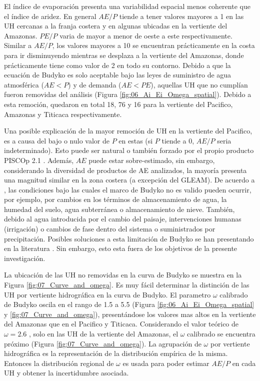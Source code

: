 \documentclass[12pt]{article}
\begin{document}
El índice de evaporación presenta una variabilidad espacial menos coherente que el índice de aridez. En general $AE/P$ tiende a tener valores mayores a 1 en las UH cercanas a la franja costera y en algunas ubicadas en la vertiente del Amazonas. $PE/P$ varia de mayor a menor de oeste a este respectivamente. Similar a $AE/P$, los valores mayores a 10 se encuentran prácticamente en la costa para ir disminuyendo mientras se desplaza a la vertiente del Amazonas, donde prácticamente tiene como valor de 2 en todo su contorno. Debido a que la ecuación de Budyko es solo aceptable bajo las leyes de suministro de agua atmosférica ($AE < P$) y de demanda ($AE < PE$), aquellas UH que no cumplían fueron removidas del análisis (Figura \ref{fig:06_Ai_Ei_Omega_spatial}). Debido a esta remoción, quedaron en total 18, 76 y 16 para la vertiente del Pacifico, Amazonas y Titicaca respectivamente.

\clearpage %

\clearpage %

Una posible explicación de la mayor remoción de UH en la vertiente del Pacifico, es a causa del bajo o nulo valor de $P$ en estas (si $P$ tiende a 0, $AE/P$ seria indeterminado). Esto puede ser natural o también forzado por el propio producto PISCOp 2.1 \citep{Aybar2019}. Además, $AE$ puede estar sobre-estimado, sin embargo, considerando la diversidad de productos de AE analizados, la mayoría presenta una magnitud similar en la zona costera (a excepción del GLEAM). De acuerdo a \citet{greve2016two}, las condiciones bajo las cuales el marco de Budyko no es valido pueden ocurrir, por ejemplo, por cambios en los términos de almacenamiento de agua, la humedad del suelo, agua subterránea o almacenamiento de nieve. También, debido al agua introducida por el cambio del paisaje, intervenciones humanas (irrigación) o cambios de fase dentro del sistema o suministrados por precipitación. Posibles soluciones a esta limitación de Budyko se han presentando en la literatura \citep{greve2016two,moussa2016budyko,fathi2019new}. Sin embargo, esto esta fuera de los objetivos de la presente investigación. 



La ubicación de las UH no removidas en la curva de Budyko se muestra en la Figura \ref{fig:07_Curve_and_omega}. Es muy fácil determinar la distinción de las UH por vertiente hidrográfica en la curva de Budyko. El parametro $\omega$ calibrado de Budyko oscila en el rango de 1.5 a 5.5 (Figura \ref{fig:06_Ai_Ei_Omega_spatial} y \ref{fig:07_Curve_and_omega}), presentándose los valores mas altos en la vertiente del Amazonas que en el Pacifico y Titicaca. Considerando el valor teórico de $\omega = 2.6$ \citep{Fu1981}, solo en las UH de la vertiente del Amazonas, el $\omega$ calibrado se encuentra próximo (Figura \ref{fig:07_Curve_and_omega}). La agrupación de $\omega$ por vertiente hidrográfica es la representación de la distribución empírica de la misma. Entonces la distribución regional de $\omega$ es usada para poder estimar $AE/P$ en cada UH y obtener la incertidumbre asociada.
\end{document}
